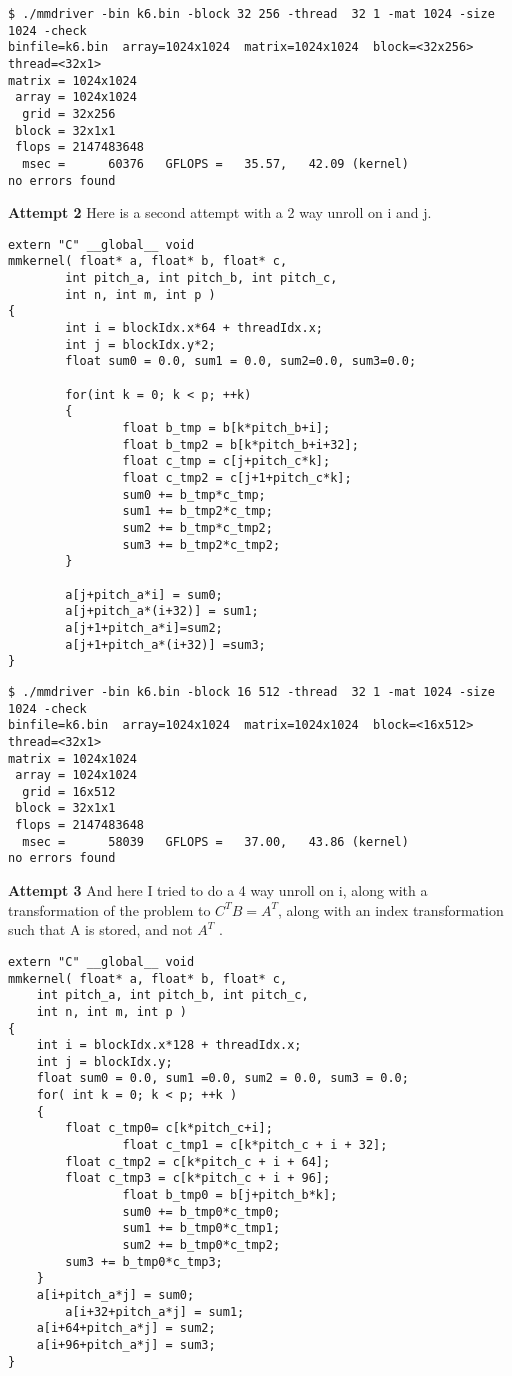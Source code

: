\documentclass[11pt]{article}
\begin{document}
\begin{enumerate}
\begin{lstlisting}
$ ./mmdriver -bin k6.bin -block 32 256 -thread  32 1 -mat 1024 -size 1024 -check
binfile=k6.bin  array=1024x1024  matrix=1024x1024  block=<32x256>  thread=<32x1>
matrix = 1024x1024
 array = 1024x1024
  grid = 32x256
 block = 32x1x1
 flops = 2147483648
  msec =      60376   GFLOPS =   35.57,   42.09 (kernel)
no errors found
\end{lstlisting}

\textbf{Attempt 2} Here is a second attempt with a 2 way unroll on i and j.

\begin{lstlisting}
extern "C" __global__ void
mmkernel( float* a, float* b, float* c,
        int pitch_a, int pitch_b, int pitch_c,
        int n, int m, int p )
{
        int i = blockIdx.x*64 + threadIdx.x;
        int j = blockIdx.y*2;
        float sum0 = 0.0, sum1 = 0.0, sum2=0.0, sum3=0.0;

        for(int k = 0; k < p; ++k)
        {
                float b_tmp = b[k*pitch_b+i];
                float b_tmp2 = b[k*pitch_b+i+32];
                float c_tmp = c[j+pitch_c*k];
                float c_tmp2 = c[j+1+pitch_c*k];
                sum0 += b_tmp*c_tmp;
                sum1 += b_tmp2*c_tmp;
                sum2 += b_tmp*c_tmp2;
                sum3 += b_tmp2*c_tmp2;
        }

        a[j+pitch_a*i] = sum0;
        a[j+pitch_a*(i+32)] = sum1;
        a[j+1+pitch_a*i]=sum2;
        a[j+1+pitch_a*(i+32)] =sum3;
}
\end{lstlisting}

\begin{lstlisting}
$ ./mmdriver -bin k6.bin -block 16 512 -thread  32 1 -mat 1024 -size 1024 -check
binfile=k6.bin  array=1024x1024  matrix=1024x1024  block=<16x512>  thread=<32x1>
matrix = 1024x1024
 array = 1024x1024
  grid = 16x512
 block = 32x1x1
 flops = 2147483648
  msec =      58039   GFLOPS =   37.00,   43.86 (kernel)
no errors found
\end{lstlisting}

\textbf{Attempt 3} And here I tried to do a 4 way unroll on i, along with a transformation of the problem to $C^TB = A^T$, along with an index transformation such that A is stored, and not $A^T$ .

\begin{lstlisting}
extern "C" __global__ void
mmkernel( float* a, float* b, float* c,
	int pitch_a, int pitch_b, int pitch_c,
	int n, int m, int p )
{
	int i = blockIdx.x*128 + threadIdx.x;
	int j = blockIdx.y;
	float sum0 = 0.0, sum1 =0.0, sum2 = 0.0, sum3 = 0.0;
	for( int k = 0; k < p; ++k )
	{
		float c_tmp0= c[k*pitch_c+i];
                float c_tmp1 = c[k*pitch_c + i + 32];
		float c_tmp2 = c[k*pitch_c + i + 64];
		float c_tmp3 = c[k*pitch_c + i + 96];
                float b_tmp0 = b[j+pitch_b*k];
                sum0 += b_tmp0*c_tmp0;
                sum1 += b_tmp0*c_tmp1;
                sum2 += b_tmp0*c_tmp2;
		sum3 += b_tmp0*c_tmp3;
	}
	a[i+pitch_a*j] = sum0;
        a[i+32+pitch_a*j] = sum1;
	a[i+64+pitch_a*j] = sum2;
	a[i+96+pitch_a*j] = sum3;
}


\end{lstlisting}
\end{enumerate}
\end{document}
